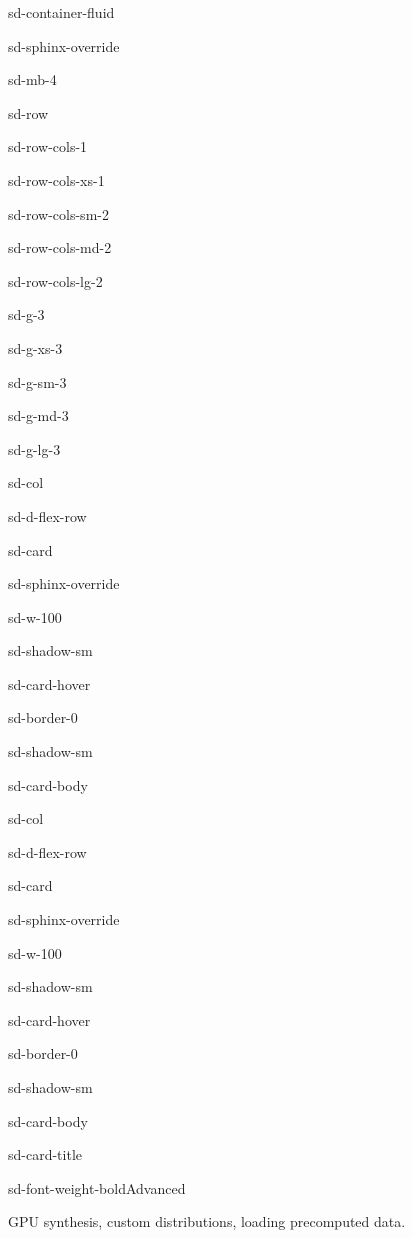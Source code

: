 \documentclass[a4paper,10pt,english]{sphinxmanual}
\begin{document}
\begin{sphinxuseclass}{sd-container-fluid}
\begin{sphinxuseclass}{sd-sphinx-override}
\begin{sphinxuseclass}{sd-mb-4}
\begin{sphinxuseclass}{sd-row}
\begin{sphinxuseclass}{sd-row-cols-1}
\begin{sphinxuseclass}{sd-row-cols-xs-1}
\begin{sphinxuseclass}{sd-row-cols-sm-2}
\begin{sphinxuseclass}{sd-row-cols-md-2}
\begin{sphinxuseclass}{sd-row-cols-lg-2}
\begin{sphinxuseclass}{sd-g-3}
\begin{sphinxuseclass}{sd-g-xs-3}
\begin{sphinxuseclass}{sd-g-sm-3}
\begin{sphinxuseclass}{sd-g-md-3}
\begin{sphinxuseclass}{sd-g-lg-3}
\begin{sphinxuseclass}{sd-col}
\begin{sphinxuseclass}{sd-d-flex-row}
\begin{sphinxuseclass}{sd-card}
\begin{sphinxuseclass}{sd-sphinx-override}
\begin{sphinxuseclass}{sd-w-100}
\begin{sphinxuseclass}{sd-shadow-sm}
\begin{sphinxuseclass}{sd-card-hover}
\begin{sphinxuseclass}{sd-border-0}
\begin{sphinxuseclass}{sd-shadow-sm}
\begin{sphinxuseclass}{sd-card-body}
\end{sphinxuseclass}{\hyperref[\detokenize{examples/safety::doc}]{}}
\end{sphinxuseclass}
\end{sphinxuseclass}
\end{sphinxuseclass}
\end{sphinxuseclass}
\end{sphinxuseclass}
\end{sphinxuseclass}
\end{sphinxuseclass}
\end{sphinxuseclass}
\end{sphinxuseclass}
\begin{sphinxuseclass}{sd-col}
\begin{sphinxuseclass}{sd-d-flex-row}
\begin{sphinxuseclass}{sd-card}
\begin{sphinxuseclass}{sd-sphinx-override}
\begin{sphinxuseclass}{sd-w-100}
\begin{sphinxuseclass}{sd-shadow-sm}
\begin{sphinxuseclass}{sd-card-hover}
\begin{sphinxuseclass}{sd-border-0}
\begin{sphinxuseclass}{sd-shadow-sm}
\begin{sphinxuseclass}{sd-card-body}
\begin{sphinxuseclass}{sd-card-title}
\begin{sphinxuseclass}{sd-font-weight-bold}Advanced
\end{sphinxuseclass}
\end{sphinxuseclass}
\sphinxAtStartPar
GPU synthesis, custom distributions, loading pre\sphinxhyphen{}computed data.


\end{sphinxuseclass}
\end{sphinxuseclass}
\end{sphinxuseclass}
\end{sphinxuseclass}
\end{sphinxuseclass}
\end{sphinxuseclass}
\end{sphinxuseclass}
\end{sphinxuseclass}
\end{sphinxuseclass}
\end{sphinxuseclass}
\end{sphinxuseclass}
\end{sphinxuseclass}
\end{sphinxuseclass}
\end{sphinxuseclass}
\end{sphinxuseclass}
\end{sphinxuseclass}
\end{sphinxuseclass}
\end{sphinxuseclass}
\end{sphinxuseclass}
\end{sphinxuseclass}
\end{sphinxuseclass}
\end{sphinxuseclass}
\end{sphinxuseclass}
\end{sphinxuseclass}
\end{document}
